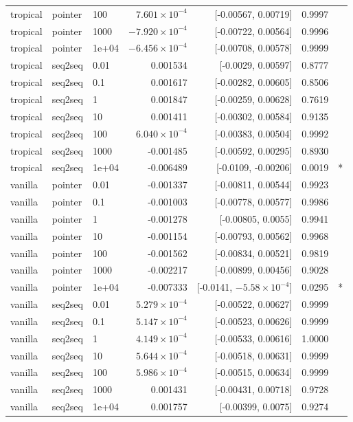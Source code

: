 \documentclass[10pt]{article}
\begin{document}
{\begin{longtable}{lllrrrl}
tropical & pointer & 100 & $7.601\times10^{-4}$ & [-0.00567, 0.00719] & 0.9997 & \\
tropical & pointer & 1000 & $-7.920\times10^{-4}$ & [-0.00722, 0.00564] & 0.9996 & \\
tropical & pointer & 1e+04 & $-6.456\times10^{-4}$ & [-0.00708, 0.00578] & 0.9999 & \\
tropical & seq2seq & 0.01 & 0.001534 & [-0.0029, 0.00597] & 0.8777 & \\
tropical & seq2seq & 0.1 & 0.001617 & [-0.00282, 0.00605] & 0.8506 & \\
tropical & seq2seq & 1 & 0.001847 & [-0.00259, 0.00628] & 0.7619 & \\
tropical & seq2seq & 10 & 0.001411 & [-0.00302, 0.00584] & 0.9135 & \\
tropical & seq2seq & 100 & $6.040\times10^{-4}$ & [-0.00383, 0.00504] & 0.9992 & \\
tropical & seq2seq & 1000 & -0.001485 & [-0.00592, 0.00295] & 0.8930 & \\
tropical & seq2seq & 1e+04 & -0.006489 & [-0.0109, -0.00206] & 0.0019 & *\\
vanilla & pointer & 0.01 & -0.001337 & [-0.00811, 0.00544] & 0.9923 & \\
vanilla & pointer & 0.1 & -0.001003 & [-0.00778, 0.00577] & 0.9986 & \\
vanilla & pointer & 1 & -0.001278 & [-0.00805, 0.0055] & 0.9941 & \\
vanilla & pointer & 10 & -0.001154 & [-0.00793, 0.00562] & 0.9968 & \\
vanilla & pointer & 100 & -0.001562 & [-0.00834, 0.00521] & 0.9819 & \\
vanilla & pointer & 1000 & -0.002217 & [-0.00899, 0.00456] & 0.9028 & \\
vanilla & pointer & 1e+04 & -0.007333 & [-0.0141, $-5.58\times10^{-4}$] & 0.0295 & *\\
vanilla & seq2seq & 0.01 & $5.279\times10^{-4}$ & [-0.00522, 0.00627] & 0.9999 & \\
vanilla & seq2seq & 0.1 & $5.147\times10^{-4}$ & [-0.00523, 0.00626] & 0.9999 & \\
vanilla & seq2seq & 1 & $4.149\times10^{-4}$ & [-0.00533, 0.00616] & 1.0000 & \\
vanilla & seq2seq & 10 & $5.644\times10^{-4}$ & [-0.00518, 0.00631] & 0.9999 & \\
vanilla & seq2seq & 100 & $5.986\times10^{-4}$ & [-0.00515, 0.00634] & 0.9999 & \\
vanilla & seq2seq & 1000 & 0.001431 & [-0.00431, 0.00718] & 0.9728 & \\
vanilla & seq2seq & 1e+04 & 0.001757 & [-0.00399, 0.0075] & 0.9274 & \\
\bottomrule
\end{longtable}
}
\end{document}
